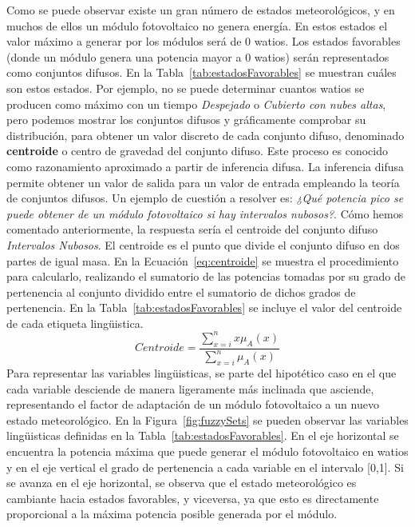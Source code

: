 Como se puede observar existe un gran número de estados meteorológicos, y en muchos de ellos un módulo fotovoltaico no genera energía. En estos estados el valor máximo a generar por los módulos será de 0 watios. Los estados favorables (donde un módulo genera una potencia mayor a 0 watios) serán representados como conjuntos difusos. En la Tabla~\ref{tab:estadosFavorables} se muestran cuáles son estos estados. Por ejemplo, no se puede determinar cuantos watios se producen como máximo con un tiempo \textit{Despejado} o \textit{Cubierto con nubes altas}, pero podemos mostrar los conjuntos difusos y gráficamente comprobar su distribución, para obtener un valor discreto de cada conjunto difuso, denominado \textbf{centroide} o centro de gravedad del conjunto difuso. Este proceso es conocido como razonamiento aproximado a partir de inferencia difusa. La inferencia difusa permite obtener un valor de salida para un valor de entrada empleando la teoría de conjuntos difusos. Un ejemplo de cuestión a resolver es: \textit{¿Qué potencia pico se puede obtener de un módulo fotovoltaico si hay intervalos nubosos?}. Cómo hemos comentado anteriormente, la respuesta sería el centroide del conjunto difuso \textit{Intervalos Nubosos}. El centroide es el punto que divide el conjunto difuso en dos partes de igual masa. En la Ecuación~\ref{eq:centroide} se muestra el procedimiento para calcularlo, realizando el sumatorio de las potencias tomadas por su grado de pertenencia al conjunto dividido entre el sumatorio de dichos grados de pertenencia. En la Tabla~\ref{tab:estadosFavorables} se incluye el valor del centroide de cada etiqueta lingüistica.\\
\begin{equation}
        \label{eq:centroide}
        Centroide = \frac{\sum_{x=i}^{n} x \mu_{A}(x)}{\sum_{x=i}^{n} \mu_{A}(x)}
\end{equation}
Para representar las variables lingüisticas, se parte del hipotético caso en el que cada variable desciende de manera ligeramente más inclinada que asciende, representando el factor de adaptación de un módulo fotovoltaico a un nuevo estado meteorológico. En la Figura~\ref{fig:fuzzySets} se pueden observar las variables lingüisticas definidas en la Tabla~\ref{tab:estadosFavorables}. En el eje horizontal se encuentra la potencia máxima que puede generar el módulo fotovoltaico en watios y en el eje vertical el grado de pertenencia a cada variable en el intervalo [0,1]. Si se avanza en el eje horizontal, se observa que el estado meteorológico es cambiante hacia estados favorables, y viceversa, ya que esto es directamente proporcional a la máxima potencia posible generada por el módulo.

